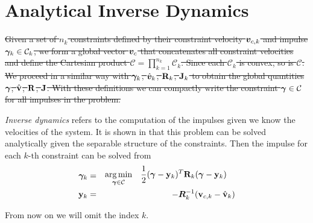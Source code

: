 \section{Analytical Inverse Dynamics}
\label{sec:analytical_inverse_dynamics}

\sout{Given a set of $n_k$ constraints defined by their constraint velocity
${\bm{v}}_{c,k}$ and impulse ${\bm\gamma}_k\in\mathcal{C}_k$, we form a global vector
${\bm{v}}_c$ that concatenates all constraint velocities and define the Cartesian
product $\mathcal{C}=\prod_{k=1}^{n_k}\mathcal{C}_k$. Since each $\mathcal{C}_k$
is convex, so is $\mathcal{C}$. We proceed in a similar way with ${\bm\gamma}_k$,
$\hat{{\bm{v}}}_k$, ${\mathbf{R}}_k$, ${\mathbf{J}}_k$ to obtain the global quantities
${\bm\gamma}$, $\hat{{\mathbf{v}}}$, ${\mathbf{R}}$, ${\mathbf{J}}$. With these definitions we can
compactly write the constraint ${\bm\gamma}\in\mathcal{C}$ for all impulses in the
problem.}

\textit{Inverse dynamics} refers to the computation of the impulses given we
know the velocities of the system. It is shown in \cite{bib:todorov2014} that
this problem can be solved analytically given the separable structure of the
constraints. Then the impulse for each $k\text{-th}$ constraint can be solved
from
\begin{eqnarray}
	{\bm\gamma}_k&=&
	\begin{aligned}
		\operatorname*{arg\,min}_{{\bm\gamma}\in\mathcal{C}} \quad &
	\frac{1}{2}({\bm\gamma}-{\mathbf{y}}_k)^T{\mathbf{R}}_k({\bm\gamma}-{\mathbf{y}}_k) \end{aligned}\\
	{\mathbf{y}}_k &=& -{\bm{R}}_k^{-1}({\mathbf{v}}_{c,k}-\hat{{\mathbf{v}}}_k)
\end{eqnarray}

From now on we will omit the index $k$. 